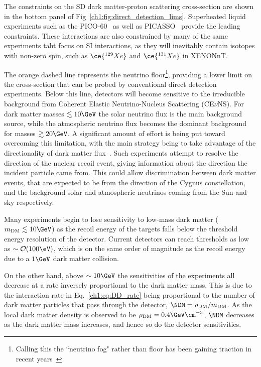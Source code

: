 The constraints on the SD dark matter-proton scattering cross-section are shown in the bottom panel of Fig~\ref{ch1:fig:direct_detection_lims}. 
Superheated liquid experiments such as the PICO-60~\cite{PICO:2019vsc_jul_Darkmattersearch} as well as PICASSO~\cite*{Behnke:2016lsk_apr_FinalResultsPICASSO} provide the leading constraints. 
These interactions are also constrained by many of the same experiments taht focus on SI interactions, as they will inevitably contain isotopes with non-zero spin, such as $\ce{^{129} Xe}$ and $\ce{^{131} Xe}$ in XENONnT. 

The orange dashed line represents the neutrino floor\footnote{Calling this the ``neutrino fog" rather than floor has been gaining traction in recent years~\cite{OHare:2021utq_dec_Foghorizonnew}}, providing a lower limit on the cross-section that can be probed by conventional direct detection experiments. Below this line, detectors will become sensitive to the irreducible background from Coherent Elastic Neutrino-Nucleus Scattering (CE$\nu$NS). For dark matter masses $\lesssim 10\GeV$ the solar neutrino flux is the main background source, while the atmospheric neutrino flux becomes the dominant background for masses $\gtrsim 20\GeV$. 
A significant amount of effort is being put toward overcoming this limitation, with the main strategy being to take advantage of the directionality of dark matter flux~\cite{Grothaus:2014hja_jun_DirectionalDarkMatter}. Such experiments attempt to resolve the direction of the nuclear recoil event, giving information about the direction the incident particle came from. This could allow discrimination between dark matter events, that are expected to be from the direction of the Cygnus constellation, and the background solar and atmospheric neutrinos coming from the Sun and sky respectively. 

Many experiments begin to lose sensitivity to low-mass dark matter ($m_\mathrm{DM}\lesssim 10\GeV$) as the recoil energy of the targets falls below the threshold energy resolution of the detector. Current detectors can reach thresholds as low as $\sim {\cal O} (100\eV)$, which is on the same order of magnitude as the recoil energy due to a $1\GeV$ dark matter collision. 

On the other hand, above $\sim 10\GeV$ the sensitivities of the experiments all decrease at a rate inversely proportional to the dark matter mass.  This is due to the interaction rate in Eq.~\ref{ch1:eq:DD_rate} being proportional to the number of dark matter particles that pass through the detector, $\NDM = \rho_\mathrm{DM}/m_\mathrm{DM}$. As the local dark matter density is observed to be $\rho_\mathrm{DM} = 0.4\GeV \cm^{-3}$, $\NDM$ decreases as the dark matter mass increases, and hence so do the detector sensitivities. 

